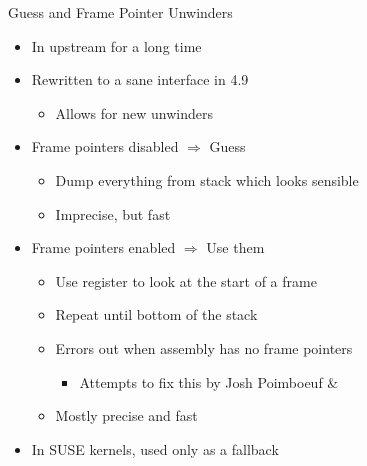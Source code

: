 \begin{frame}{Guess and Frame Pointer Unwinders}

  \begin{itemize}[<+->]
    \item In upstream for a long time

    \item Rewritten to a sane interface in 4.9
    \begin{itemize}
      \item Allows for new unwinders
    \end{itemize}

    \item Frame pointers disabled $\Rightarrow$ Guess
    \begin{itemize}[<+->]
      \item Dump everything from stack which looks sensible
      \item Imprecise, but fast
    \end{itemize}

    \item Frame pointers enabled $\Rightarrow$ Use them
    \begin{itemize}[<+->]
      \item Use  register to look at the start of a frame
      \item Repeat until bottom of the stack
      \item Errors out when assembly has no frame pointers
      \begin{itemize}[<+->]
	\item Attempts to fix this by Josh Poimboeuf \& \objt
      \end{itemize}
      \item Mostly precise and fast
    \end{itemize}

    \item In SUSE kernels, used only as a fallback
  \end{itemize}

\end{frame}

